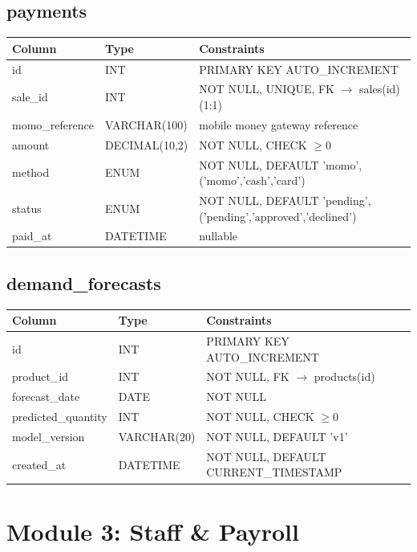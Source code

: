 \documentclass[11pt,a4paper]{report}
\newcommand{\schemahead}{%
  \toprule
  \textbf{Column} & \textbf{Type} & \textbf{Constraints} \\
  \midrule
}
\begin{document}
\subsection*{payments}
\begin{center}
\begin{tabular}{@{}p{3.6cm}p{2.6cm}p{7.3cm}@{}}
\schemahead
id & INT & PRIMARY KEY AUTO\_INCREMENT \\
sale\_id & INT & NOT NULL, UNIQUE, FK $\rightarrow$ sales(id) (1:1) \\
momo\_reference & VARCHAR(100) & mobile money gateway reference \\
amount & DECIMAL(10,2) & NOT NULL, CHECK $\geq 0$ \\
method & ENUM & NOT NULL, DEFAULT 'momo', ('momo','cash','card') \\
status & ENUM & NOT NULL, DEFAULT 'pending', ('pending','approved','declined') \\
paid\_at & DATETIME & nullable \\
\bottomrule
\end{tabular}
\end{center}

\subsection*{demand\_forecasts}
\begin{center}
\begin{tabular}{@{}p{3.6cm}p{2.6cm}p{7.3cm}@{}}
\schemahead
id & INT & PRIMARY KEY AUTO\_INCREMENT \\
product\_id & INT & NOT NULL, FK $\rightarrow$ products(id) \\
forecast\_date & DATE & NOT NULL \\
predicted\_quantity & INT & NOT NULL, CHECK $\geq 0$ \\
model\_version & VARCHAR(20) & NOT NULL, DEFAULT 'v1' \\
created\_at & DATETIME & NOT NULL, DEFAULT CURRENT\_TIMESTAMP \\
\bottomrule
\end{tabular}
\end{center}

\section{Module 3: Staff \& Payroll}
\end{document}
